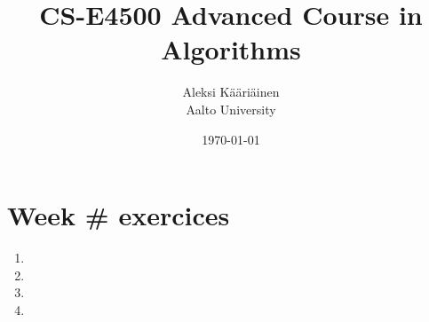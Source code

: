 \documentclass[11pt,a4paper]{article}
\title{CS-E4500 Advanced Course in Algorithms}
\author{Aleksi Kääriäinen  \\
	Aalto University  \\
	}
\begin{document}
\date{\today}
\maketitle

\newpage

\section*{Week \# exercices}

\begin{enumerate}
      \item

            \newpage

      \item

            \newpage

      \item

            \newpage

      \item

            \newpage
\end{enumerate}
\end{document}
